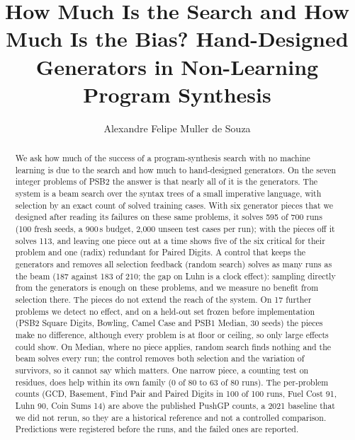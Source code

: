 \documentclass[sigconf,nonacm]{acmart}
\begin{document}
\title{How Much Is the Search and How Much Is the Bias? Hand-Designed Generators in Non-Learning Program Synthesis}

\author{Alexandre Felipe Muller de Souza}

\begin{abstract}
We ask how much of the success of a program-synthesis search with no machine learning is due to the search and how much to hand-designed
generators. On the seven integer problems of PSB2 the answer is that nearly all of it is the generators. The system is a beam search over the syntax trees of a small imperative language, with
selection by an exact count of solved training cases. With six generator pieces that we designed after reading its failures on these same problems, it solves 595 of 700 runs
(100 fresh seeds, a 900\,s budget, 2,000 unseen test cases per run); with the pieces off it solves 113, and leaving one piece out at a time shows five of the six critical for their problem
and one (radix) redundant for Paired Digits. A control that keeps the generators and removes all selection feedback (random search) solves as many runs as the beam (187 against 183 of 210; the gap on Luhn is a clock effect):
sampling directly from the generators is enough on these problems, and we measure no benefit from selection there. The pieces do not extend the reach of the system. On 17 further problems we detect no effect, and on a held-out set
frozen before implementation (PSB2 Square Digits, Bowling, Camel Case and PSB1 Median, 30 seeds) the pieces make no difference, although every problem is at floor or ceiling, so only large effects could show.
On Median, where no piece applies, random search finds nothing and the beam solves every run; the control removes both selection and the variation of survivors, so it cannot say which matters. One narrow piece, a counting test on residues, does help within its own family
(0 of 80 to 63 of 80 runs). The per-problem counts (GCD, Basement, Find Pair and Paired Digits in 100 of 100 runs, Fuel Cost 91, Luhn 90, Coin Sums 14) are above the published PushGP counts, a 2021 baseline that we did not rerun,
so they are a historical reference and not a controlled comparison. Predictions were registered before the runs, and the failed ones are reported.
\end{abstract}

\end{document}
